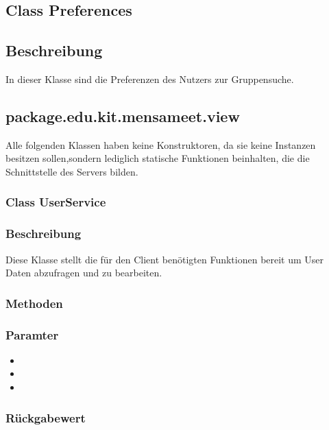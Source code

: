 \documentclass[a4paper]{scrreprt}
\begin{document}
\subsection{Class Preferences}
\subsection*{Beschreibung}
In dieser Klasse sind die Preferenzen des Nutzers zur Gruppensuche.



\subsection{package.edu.kit.mensameet.view}

Alle folgenden Klassen haben keine Konstruktoren, da sie keine Instanzen besitzen sollen,sondern lediglich statische Funktionen beinhalten, die die Schnittstelle des Servers bilden.

\subsubsection{Class UserService}
\subsubsection*{Beschreibung}
Diese Klasse stellt die für den Client benötigten Funktionen bereit um User Daten abzufragen und zu bearbeiten. 

\subsubsection*{Methoden}
\begin{addmargin}[25pt]{0pt}

\subsubsection*{Paramter}
\begin{itemize}
\item
\item
\item
\end{itemize}

\subsubsection*{Rückgabewert}
\end{addmargin}
\end{document}
